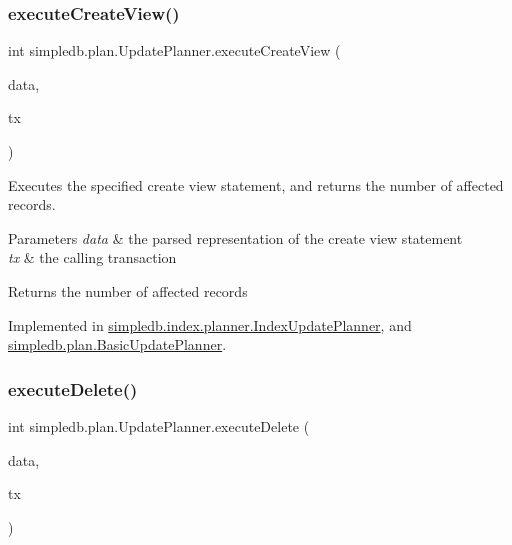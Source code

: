 \subsubsection{\texorpdfstring{execute\+Create\+View()}{executeCreateView()}}
{\footnotesize\ttfamily int simpledb.\+plan.\+Update\+Planner.\+execute\+Create\+View (\begin{DoxyParamCaption}\item[{\hyperlink{classsimpledb_1_1parse_1_1CreateViewData}{Create\+View\+Data}}]{data,  }\item[{\hyperlink{classsimpledb_1_1tx_1_1Transaction}{Transaction}}]{tx }\end{DoxyParamCaption})}

Executes the specified create view statement, and returns the number of affected records. 
\begin{DoxyParams}{Parameters}
{\em data} & the parsed representation of the create view statement \\
\hline
{\em tx} & the calling transaction \\
\hline
\end{DoxyParams}
\begin{DoxyReturn}{Returns}
the number of affected records 
\end{DoxyReturn}


Implemented in \hyperlink{classsimpledb_1_1index_1_1planner_1_1IndexUpdatePlanner_aa1ce4cdb68a43048a7809b08a28149f0}{simpledb.\+index.\+planner.\+Index\+Update\+Planner}, and \hyperlink{classsimpledb_1_1plan_1_1BasicUpdatePlanner_a2c43aed5eb272962bd57a66bdb200ce3}{simpledb.\+plan.\+Basic\+Update\+Planner}.

\mbox{\label{interfacesimpledb_1_1plan_1_1UpdatePlanner_a7141a96cb092881cc149f0804bbafc20}} 
\subsubsection{\texorpdfstring{execute\+Delete()}{executeDelete()}}
{\footnotesize\ttfamily int simpledb.\+plan.\+Update\+Planner.\+execute\+Delete (\begin{DoxyParamCaption}\item[{\hyperlink{classsimpledb_1_1parse_1_1DeleteData}{Delete\+Data}}]{data,  }\item[{\hyperlink{classsimpledb_1_1tx_1_1Transaction}{Transaction}}]{tx }\end{DoxyParamCaption})}

